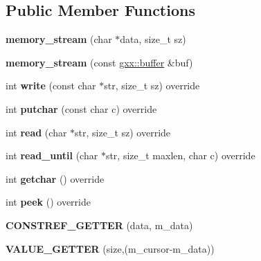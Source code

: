 \subsection*{Public Member Functions}
\begin{DoxyCompactItemize}
\item 
{\bfseries memory\+\_\+stream} (char $\ast$data, size\+\_\+t sz)\hypertarget{classgxx_1_1memory__stream_a49a6e0be5744c7373d999beabc69b44b}{}\label{classgxx_1_1memory__stream_a49a6e0be5744c7373d999beabc69b44b}

\item 
{\bfseries memory\+\_\+stream} (const \hyperlink{classgxx_1_1buffer}{gxx\+::buffer} \&buf)\hypertarget{classgxx_1_1memory__stream_aaee5560d8e0e11ff24a77ba9a217ae1c}{}\label{classgxx_1_1memory__stream_aaee5560d8e0e11ff24a77ba9a217ae1c}

\item 
int {\bfseries write} (const char $\ast$str, size\+\_\+t sz) override\hypertarget{classgxx_1_1memory__stream_a38b90bbecf965860615f8a6fdc3e6961}{}\label{classgxx_1_1memory__stream_a38b90bbecf965860615f8a6fdc3e6961}

\item 
int {\bfseries putchar} (const char c) override\hypertarget{classgxx_1_1memory__stream_a55c81dee9f8057cf653bb336edd02969}{}\label{classgxx_1_1memory__stream_a55c81dee9f8057cf653bb336edd02969}

\item 
int {\bfseries read} (char $\ast$str, size\+\_\+t sz) override\hypertarget{classgxx_1_1memory__stream_aa018be361ae359bf88a706533b81be3d}{}\label{classgxx_1_1memory__stream_aa018be361ae359bf88a706533b81be3d}

\item 
int {\bfseries read\+\_\+until} (char $\ast$str, size\+\_\+t maxlen, char c) override\hypertarget{classgxx_1_1memory__stream_a0794a4482c1ba6ffdf062828bf391b64}{}\label{classgxx_1_1memory__stream_a0794a4482c1ba6ffdf062828bf391b64}

\item 
int {\bfseries getchar} () override\hypertarget{classgxx_1_1memory__stream_a77494047dab60c769d2642874759b509}{}\label{classgxx_1_1memory__stream_a77494047dab60c769d2642874759b509}

\item 
int {\bfseries peek} () override\hypertarget{classgxx_1_1memory__stream_a819b313dc0ed540496d6e87f31f69291}{}\label{classgxx_1_1memory__stream_a819b313dc0ed540496d6e87f31f69291}

\item 
{\bfseries C\+O\+N\+S\+T\+R\+E\+F\+\_\+\+G\+E\+T\+T\+ER} (data, m\+\_\+data)\hypertarget{classgxx_1_1memory__stream_a3912fe6d973b5e9b50dde14a4283c136}{}\label{classgxx_1_1memory__stream_a3912fe6d973b5e9b50dde14a4283c136}

\item 
{\bfseries V\+A\+L\+U\+E\+\_\+\+G\+E\+T\+T\+ER} (size,(m\+\_\+cursor-\/m\+\_\+data))\hypertarget{classgxx_1_1memory__stream_ae4da697dfcc2e3bc24f3d12cac912631}{}\label{classgxx_1_1memory__stream_ae4da697dfcc2e3bc24f3d12cac912631}

\end{DoxyCompactItemize}
